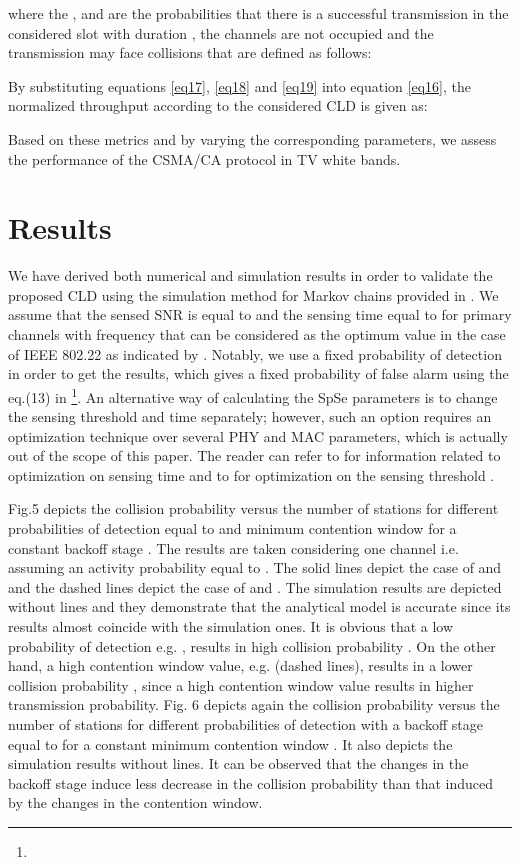 \documentclass
[journal,11pt,draftclsnofoot,onecolumn,doublespace]{tETN2e}
\begin{document}
where the ,  and  are the probabilities that there is a successful transmission in the considered slot with duration , the channels are not occupied and the transmission may face collisions that are defined as follows: 



By substituting equations \eqref{eq17}, \eqref{eq18} and \eqref{eq19} into equation \eqref{eq16}, the normalized throughput according to the considered CLD is given as: 

Based on these metrics and by varying the corresponding parameters, we assess the performance of the CSMA/CA protocol in TV white bands. 

\section{Results}

We have derived both numerical and simulation results in order to validate the proposed CLD using the simulation method for Markov chains provided in \citep{tranter03}. We assume that the sensed SNR is equal to  and the sensing time equal to  for primary channels with frequency  that can be considered as the optimum value in the case of IEEE 802.22 as indicated by \citep{liang08}. Notably, we use a fixed probability of detection  in order to get the results, which gives a fixed probability of false alarm  using the eq.(13) in \citep{liang08} \footnote{}. An alternative way of calculating the SpSe parameters is to change the sensing threshold  and time  separately; however, such an option requires an optimization technique over several PHY and MAC parameters, which is actually out of the scope of this paper. The reader can refer to \citep{liang08} for information related to optimization on sensing time  and to \citep{foukalas12} for optimization on the sensing threshold .  

Fig.5 depicts the collision probability  versus the number of stations  for different probabilities of detection  equal to  and minimum contention window  for a constant backoff stage . The results are  taken considering one channel i.e.  assuming an activity probability equal to . The solid lines depict the case of  and  and the dashed lines depict the case of  and . The simulation results are depicted without lines and they demonstrate that the analytical model is accurate since its results almost coincide with the simulation ones. It is obvious that a low probability of detection e.g. , results in high collision probability . On the other hand, a high contention window value, e.g.  (dashed lines), results in a lower collision probability , since a high contention window value results in higher transmission probability. Fig. 6 depicts again the collision probability  versus the number of stations  for different probabilities of detection  with a backoff stage equal to  for a constant minimum contention window . It also depicts the simulation results without lines. It can be observed that the changes in the backoff stage induce less decrease in the collision probability  than that induced by the changes in the contention window.
\end{document}

